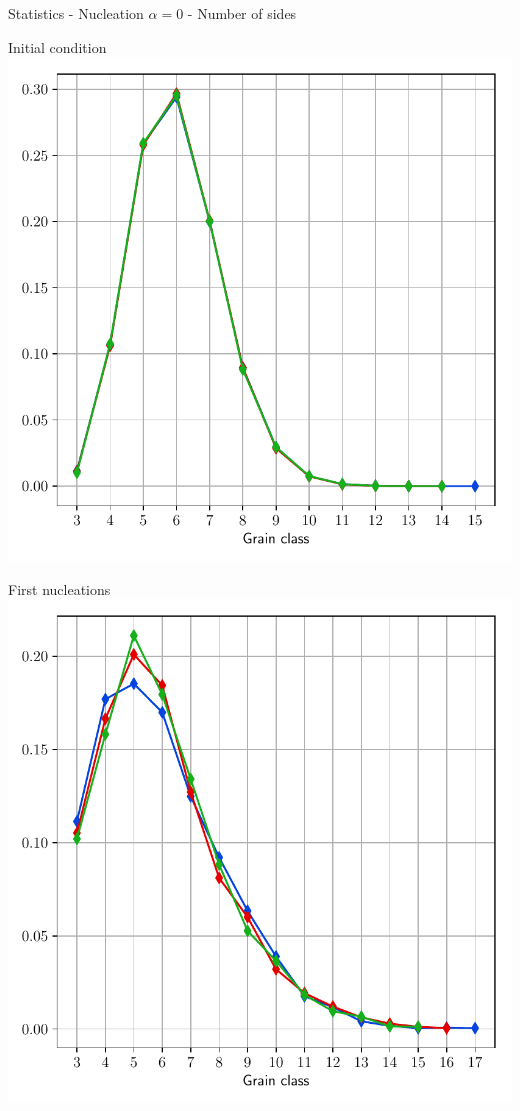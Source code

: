 \documentclass[usenames,dvipsnames]{beamer}
\begin{document}
\begin{frame}{Statistics - Nucleation $\alpha = 0$ - Number of sides}
\small
    \begin{minipage}{0.5\textwidth}
    \centering
    \scriptsize
    Initial condition
    \includegraphics[trim={0 1em 0 1.1em},clip=true,scale=0.335]{figures/stored_energy/SE/nsides/000000_nuclconstant_set.pdf}
    \end{minipage}%
    \begin{minipage}{0.5\textwidth}
    \centering
    \scriptsize
    First nucleations
    \includegraphics[trim={0 1em 0 1.1em},clip=true,scale=0.335]{figures/stored_energy/SE/nsides/000070_nuclconstant_set.pdf}\\

\end{minipage}
\end{frame}
\end{document}

